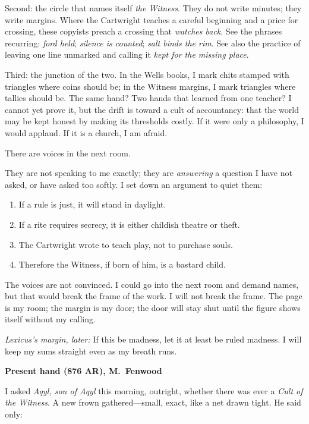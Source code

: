 \documentclass[11pt]{article}
\numberwithin{equation}{section} %
\theoremstyle{plain} %
\theoremstyle{definition} %
\theoremstyle{remark} %
\begin{document}
Second: the circle that names itself \textit{the Witness}. They do not write minutes; they write margins. Where the Cartwright teaches a careful beginning and a price for crossing, these copyists preach a crossing that \emph{watches back}. See the phrases recurring: \emph{ford held}; \emph{silence is counted}; \emph{salt binds the rim}. See also the practice of leaving one line unmarked and calling it \emph{kept for the missing place}.

Third: the junction of the two. In the Wells books, I mark chits stamped with triangles where coins should be; in the Witness margins, I mark triangles where tallies should be. The same hand? Two hands that learned from one teacher? I cannot yet prove it, but the drift is toward a cult of accountancy: that the world may be kept honest by making its thresholds costly. If it were only a philosophy, I would applaud. If it is a church, I am afraid.

There are voices in the next room.

They are not speaking to me exactly; they are \emph{answering} a question I have not asked, or have asked too softly. I set down an argument to quiet them:

\begin{enumerate}\setlength\itemsep{0.25em}
  \item If a rule is just, it will stand in daylight.
  \item If a rite requires secrecy, it is either childish theatre or theft.
  \item The Cartwright wrote to teach play, not to purchase souls.
  \item Therefore the Witness, if born of him, is a bastard child.
\end{enumerate}

The voices are not convinced. I could go into the next room and demand names, but that would break the frame of the work. I will not break the frame. The page is my room; the margin is my door; the door will stay shut until the figure shows itself without my calling.

\medskip
\noindent\textit{Lexicus’s margin, later:} If this be madness, let it at least be ruled madness. I will keep my sums straight even as my breath runs.

\medskip
\noindent\textbf{Present hand (876 AR), M.\ Fenwood}

I asked \textit{Aqyl, son of Aqyl} this morning, outright, whether there was ever a \emph{Cult of the Witness}. A new frown gathered—small, exact, like a net drawn tight. He said only:
\end{document}
